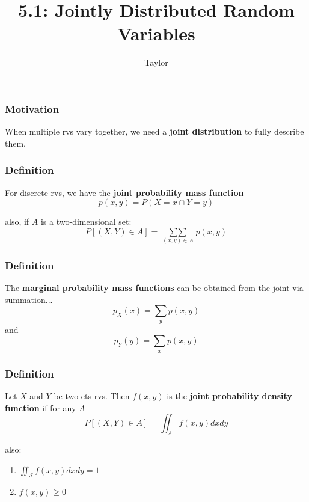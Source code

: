 \documentclass{beamer}
\title["5.1"]{5.1: Jointly Distributed Random Variables}
\author{Taylor}
\institute[UVA] 
{
University of Virginia \\
\medskip
\textit{} 
}
\date{}
\begin{document}

\begin{frame}
\titlepage 
\end{frame}

\begin{frame}
\frametitle{Motivation}

When multiple rvs vary together, we need a \textbf{joint distribution} to fully describe them.

\end{frame}

\begin{frame}
\frametitle{Definition}

For discrete rvs, we have the \textbf{joint probability mass function}
\[
p(x,y) = P(X=x \cap Y = y)
\]

also, if $A$ is a two-dimensional set:
\[
P[(X,Y) \in A] = \mathop{\sum\sum}\limits_{(x,y) \in A} p(x,y)   
\]

\end{frame}

\begin{frame}
\frametitle{Definition}

The \textbf{marginal probability mass functions} can be obtained from the joint via summation...
\[
p_X(x) = \sum_y p(x,y)
\]
and
\[
p_Y(y) = \sum_x p(x,y)
\]
\end{frame}

\begin{frame}
\frametitle{Definition}

Let $X$ and $Y$ be two cts rvs. Then $f(x,y)$ is the \textbf{joint probability density function} if for any $A$
\[
P[(X,Y) \in A] = \iint_A f(x,y) dxdy
\]

also:
\begin{enumerate}
\item $\iint_{\mathcal{S}} f(x,y)dxdy = 1$
\item $f(x,y) \ge 0$
\end{enumerate}

\end{frame}
\end{document}
